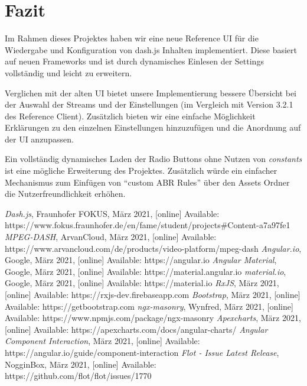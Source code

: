 \documentclass[conference]{IEEEtran}
\begin{document}
\section{Fazit}
Im Rahmen dieses Projektes haben wir eine neue Reference UI für die Wiedergabe und Konfiguration von dash.js Inhalten implementiert. Diese basiert auf neuen Frameworks und ist durch dynamisches Einlesen der Settings vollständig und leicht zu erweitern.

Verglichen mit der alten UI bietet unsere Implementierung bessere Übersicht bei der Auswahl der Streams und der Einstellungen (im Vergleich mit Version 3.2.1 des Reference Client). Zusätzlich bieten wir eine einfache Möglichkeit Erklärungen zu den einzelnen Einstellungen hinzuzufügen und die Anordnung auf der UI anzupassen.


Ein vollständig dynamisches Laden der Radio Buttons ohne Nutzen von \textit{constants} ist eine mögliche Erweiterung des Projektes. Zusätzlich würde ein einfacher Mechanismus zum Einfügen von “custom ABR Rules” über den Assets Ordner die Nutzerfreundlichkeit erhöhen. 



\begin{thebibliography}{00}
 \textit{Dash.js}, Fraunhofer FOKUS, März 2021, [online] Available: https://www.fokus.fraunhofer.de/en/fame/student/projects\#Content-a7a97fe1
 \textit{MPEG-DASH}, ArvanCloud, März 2021, [online] Available: https://www.arvancloud.com/de/products/video-platform/mpeg-dash
 \textit{Angular.io}, Google, März 2021, [online] Available: https://angular.io
 \textit{Angular Material}, Google, März 2021, [online] Available: https://material.angular.io
 \textit{material.io}, Google, März 2021, [online] Available: https://material.io
 \textit{RxJS}, März 2021, [online] Available: https://rxjs-dev.firebaseapp.com
 \textit{Bootstrap}, März 2021, [online] Available: https://getbootstrap.com
 \textit{ngx-masonry}, Wynfred, März 2021, [online] Available: https://www.npmjs.com/package/ngx-masonry
 \textit{Apexcharts}, März 2021, [online] Available: https://apexcharts.com/docs/angular-charts/
 \textit{Angular Component Interaction}, März 2021, [online] Available: https://angular.io/guide/component-interaction
 \textit{Flot - Issue Latest Release}, NogginBox, März 2021, [online] Available: https://github.com/flot/flot/issues/1770
\end{thebibliography}
\vspace{12pt}
\end{document}
